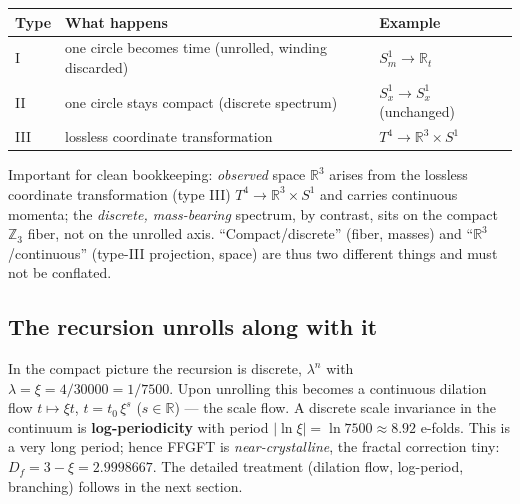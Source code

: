 \begin{center}
\begin{tabular}{@{}p{1.5cm} p{6.2cm} p{4.3cm}@{}}
\toprule
Type & What happens & Example \\
\midrule
I & one circle becomes time (unrolled, winding discarded) & $S^1_m\to\mathbb{R}_t$ \\
II & one circle stays compact (discrete spectrum) & $S^1_x\to S^1_x$ (unchanged) \\
III & lossless coordinate transformation & $T^4\to\mathbb{R}^3\times S^1$ \\
\bottomrule
\end{tabular}
\end{center}

Important for clean bookkeeping: \emph{observed} space $\mathbb{R}^3$ arises from the lossless
coordinate transformation (type III) $T^4\to\mathbb{R}^3\times S^1$ and carries continuous momenta;
the \emph{discrete, mass-bearing} spectrum, by contrast, sits on the compact $\mathbb{Z}_3$ fiber, not
on the unrolled axis. \enquote{Compact/discrete} (fiber, masses) and
\enquote{$\mathbb{R}^3$/continuous} (type-III projection, space) are thus two different things and
must not be conflated.

\subsection{The recursion unrolls along with it}
In the compact picture the recursion is discrete, $\lambda^n$ with $\lambda=\xi=4/30000=1/7500$. Upon
unrolling this becomes a continuous dilation flow $t\mapsto\xi t$, $t=t_0\,\xi^s$ ($s\in\mathbb{R}$)
--- the scale flow. A discrete scale invariance in the continuum is \textbf{log-periodicity} with
period $|\ln\xi|=\ln 7500\approx 8.92$ e-folds. This is a very long period; hence FFGFT is
\emph{near-crystalline}, the fractal correction tiny: $D_f=3-\xi=2.9998667$. The detailed treatment
(dilation flow, log-period, branching) follows in the next section.

